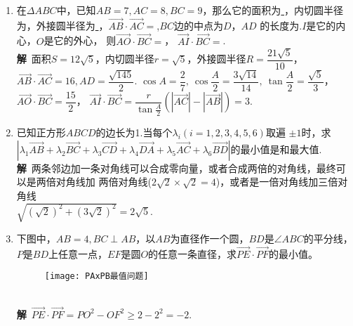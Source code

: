 \begin{enumerate}[leftmargin=\inteval{\myenumleftmargin}pt]
\item 在$ \Delta ABC $中，已知$ AB=7,AC=8,BC=9 $，那么它的面积为\underline{
    \hspace{1cm}}，内切圆半径为\underline{\hspace{1cm}}，外接圆半径为\underline{
    \hspace{1cm}}，$ \vec{AB}\cdot \vec{AC}
=$\underline{\hspace{1cm}},$ BC $边的中点为$ D $，$ AD $
的长度为\underline{\hspace{1cm}}.$ I $是它的内心，$ O $是它的外心，
则$ \vec{AO}\cdot\vec{BC} = $\underline{\hspace{2cm}}，
$ \vec{AI}\cdot\vec{BC}= $\underline{\hspace{2cm}}.
\ifteach \\
\textbf{解}\ 面积$ S=12\sqrt{5} $，内切圆半径$ r=\sqrt{5}$，外接圆半径$ R=\dfrac{21
    \sqrt{5}}{10} $，$ \vec{AB}\cdot \vec{AC} = 16,
AD=\dfrac{\sqrt{145}}{2} $. 
$ \cos A=\dfrac{2}{7},\ \cos\dfrac{A}{2}=\dfrac{3\sqrt{14}}{14},\ \tan\dfrac{A}{2}=
\dfrac{\sqrt{5}}{3} $，
$ \vec{AO}\cdot\vec{BC}=\dfrac{15}{2} $，
$ \vec{AI}\cdot\vec{BC}=\dfrac{r}{\tan \frac{A}{2}}
\left(|\vec{AC}|-|\vec{AB}|\right)=3 $. 
\fi

\item 已知正方形$ ABCD $的边长为1.当每个$ \lambda_i(i=1,2,3,4,5,6) $取遍
$ \pm 1 $时，求\\ $|\lambda_1\vec{AB}+\lambda_2\vec{BC}+\lambda_3
\vec{CD}+\lambda_4\vec{DA}+\lambda_5 \vec{AC}+\lambda_6\vec{BD}| 
$的最小值是和最大值.
\ifteach \\ \textbf{解}\ 
两条邻边加一条对角线可以合成零向量，或者合成两倍的对角线，最终可以是两倍对角线加
两倍对角线($ 2\sqrt{2}\times \sqrt{2} =4 $)，或者是一倍对角线加三倍对角线\\
$ \sqrt{(\sqrt{2})^2+(3\sqrt{2})^2}=2\sqrt{5} $. 
\fi

\item 下图中，$ AB=4,BC \perp AB $，以$ AB $为直径作一个圆，$ BD $是$ \angle ABC $的平分线，$ P $是$ BD $上任意一点，$ EF $是圆$ O $的任意一条直径，求$ \vec{PE}\cdot \vec{PF} $的最小值。
\begin{figure}[h]
    \centering
    \texttt{[image: PAxPB最值问题]}
\end{figure}
\ifteach \\ \textbf{解}\ 
$ \vec{PE}\cdot \vec{PF}=
PO^2-OF^2 \geq 2-2^2=-2 $. 
\fi


\end{enumerate}
